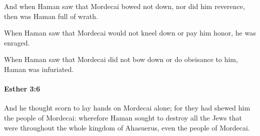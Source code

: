 			\begin{versebox}
					\item[BHS] 
					\item[LXX] 
					\item[ASV] And when Haman saw that Mordecai bowed not down, nor did him reverence, then was Haman full of wrath.
					\item[NIV] When Haman saw that Mordecai would not kneel down or pay him honor, he was enraged.
					\item[NRSV] When Haman saw that Mordecai did not bow down or do obeisance to him, Haman was infuriated.
			\end{versebox}

		\paragraph{Esther 3:6} %
			\label{ESTHER-3-6}

			And he thought scorn to lay hands on Mordecai alone; for they had shewed him the people of Mordecai: wherefore Haman sought to destroy all the Jews that were throughout the whole kingdom of Ahasuerus, even the people of Mordecai.


